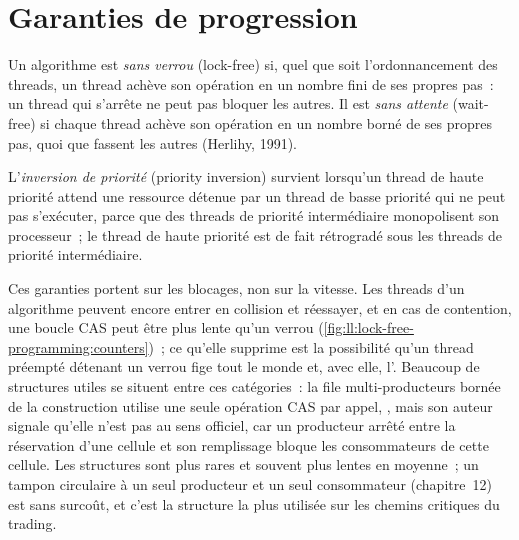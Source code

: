 \section{Garanties de progression}

\begin{definition}\label{def:ll:lock-free-programming:progress}
Un algorithme est \emph{sans verrou} (lock-free) si, quel que soit l'ordonnancement des threads, un thread achève son
opération en un nombre fini de ses propres pas~: un thread qui s'arrête ne peut pas bloquer les autres. Il est \emph{sans attente} (wait-free)
si chaque thread achève son opération en un nombre borné de ses propres pas, quoi que fassent les autres (Herlihy, 1991).
\end{definition}

\begin{definition}\label{def:ll:lock-free-programming:inversion}
L'\emph{inversion de priorité} (priority inversion) survient lorsqu'un thread de haute priorité attend une ressource détenue par un
thread de basse priorité qui ne peut pas s'exécuter, parce que des threads de priorité intermédiaire monopolisent son processeur~; le thread de haute priorité est
de fait rétrogradé sous les threads de priorité intermédiaire.
\end{definition}

Ces garanties portent sur les blocages, non sur la vitesse. Les threads d'un algorithme  peuvent encore entrer en collision et réessayer, et en cas de
contention, une boucle CAS peut être plus lente qu'un verrou (\cref{fig:ll:lock-free-programming:counters})~; ce qu'elle supprime est la
possibilité qu'un thread préempté détenant un verrou fige tout le monde et, avec elle, l'. Beaucoup de structures utiles
se situent entre ces catégories~: la file multi-producteurs bornée de la construction utilise une seule opération CAS par appel, , mais son auteur signale qu'elle n'est pas  au sens officiel, car un producteur arrêté entre la réservation d'une
cellule et son remplissage bloque les consommateurs de cette cellule. Les structures  sont plus rares et souvent plus lentes en moyenne~; un
tampon circulaire à un seul producteur et un seul consommateur (chapitre~12) est  sans surcoût, et c'est la structure la plus utilisée sur les chemins critiques du trading.

